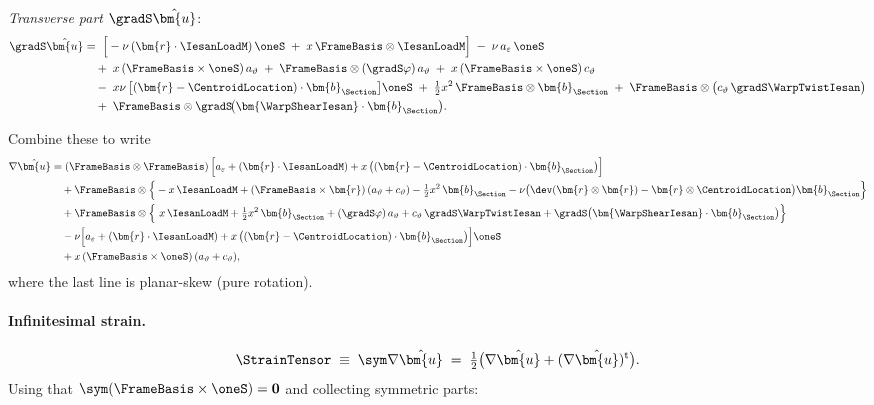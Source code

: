 \emph{Transverse part} $\gradS\hat{\bm{u}}$:
\[
\begin{aligned}
\gradS\hat{\bm{u}}
&=\; \Big[-\nu\,(\bm{r}\cdot\IesanLoadM)\,\oneS \;+\; x\,\FrameBasis\otimes \IesanLoadM\Big]
\;-\;\nu\,a_\varepsilon\,\oneS
\\&\quad
+\; x\,( \FrameBasis\times \oneS)\,a_\vartheta
\;+\; \FrameBasis\otimes(\gradS\varphi)\,a_\vartheta
\;+\; x\,( \FrameBasis\times \oneS)\,c_\vartheta
\\&\quad
-\; x\nu\,\bigl[(\bm{r}-\CentroidLocation)\cdot\bm{b}_{\Section}\bigr]\oneS
\;+\; \tfrac12 x^2\,\FrameBasis\otimes \bm{b}_{\Section}
\;+\; \FrameBasis\otimes\bigl(c_\vartheta\,\gradS\WarpTwistIesan\bigr)
\\&\quad
+\; \FrameBasis\otimes \gradS\!\big(\bm{\WarpShearIesan}\cdot \bm{b}_{\Section}\big).
\end{aligned}
\]

Combine these to write
\[
\begin{aligned}
\nabla \hat{\bm{u}}
&= (\FrameBasis\otimes\FrameBasis)\,\Big[a_\varepsilon+(\bm{r}\cdot\IesanLoadM)
+ x\,\big((\bm{r}-\CentroidLocation)\cdot\bm{b}_{\Section}\big)\Big]
\\&\quad
+\FrameBasis\otimes\Big\{
-x\,\IesanLoadM
+ (\FrameBasis\times\bm{r})\,(a_\vartheta+c_\vartheta)
-\tfrac12 x^2\,\bm{b}_{\Section}
-\nu\bigl(\dev(\bm{r}\otimes\bm{r})-\bm{r}\otimes\CentroidLocation\bigr)\bm{b}_{\Section}
\Big\}
\\&\quad
+ \FrameBasis\otimes\Big\{
~x\,\IesanLoadM + \tfrac12 x^2\,\bm{b}_{\Section}
+ (\gradS\varphi)\,a_\vartheta
+ c_\vartheta\,\gradS\WarpTwistIesan
+ \gradS \big(\bm{\WarpShearIesan}\cdot\bm{b}_{\Section}\big)
\Big\}
\\&\quad
-\nu\Big[a_\varepsilon+(\bm{r}\cdot\IesanLoadM)
+ x\,\big((\bm{r}-\CentroidLocation)\cdot\bm{b}_{\Section}\big)\Big]\oneS
\\&\quad
+ x\,(\FrameBasis\times \oneS)\,(a_\vartheta+c_\vartheta),
\end{aligned}
\]
where the last line is planar-skew (pure rotation).


\paragraph{Infinitesimal strain.}
\[
\StrainTensor \;\equiv\; \sym\nabla\hat{\bm{u}}
\;=\; \tfrac12\big(\nabla\hat{\bm{u}}+(\nabla\hat{\bm{u}})^{\mathrm t}\big).
\]
Using that $\sym(\FrameBasis\times\oneS)=\mathbf{0}$  and collecting symmetric parts:

